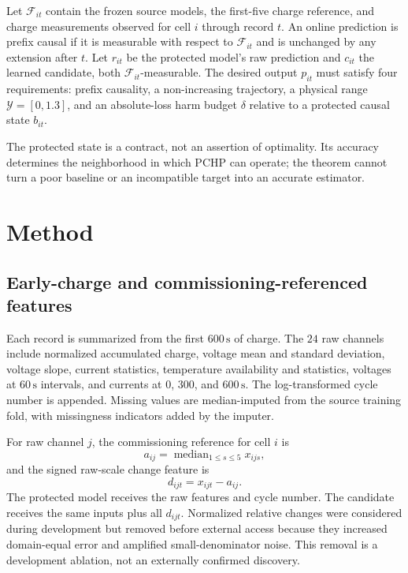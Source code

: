 \documentclass[11pt]{article}
\begin{document}
Let $\mathcal F_{it}$ contain the frozen source models, the first-five charge reference, and charge measurements observed for cell $i$ through record $t$. An online prediction is prefix causal if it is measurable with respect to $\mathcal F_{it}$ and is unchanged by any extension after $t$. Let $r_{it}$ be the protected model's raw prediction and $c_{it}$ the learned candidate, both $\mathcal F_{it}$-measurable. The desired output $p_{it}$ must satisfy four requirements: prefix causality, a non-increasing trajectory, a physical range $\mathcal Y=[0,1.3]$, and an absolute-loss harm budget $\delta$ relative to a protected causal state $b_{it}$.

The protected state is a contract, not an assertion of optimality. Its accuracy determines the neighborhood in which PCHP can operate; the theorem cannot turn a poor baseline or an incompatible target into an accurate estimator.

\section{Method}

\subsection{Early-charge and commissioning-referenced features}

Each record is summarized from the first $600\,\mathrm{s}$ of charge. The $24$ raw channels include normalized accumulated charge, voltage mean and standard deviation, voltage slope, current statistics, temperature availability and statistics, voltages at $60\,\mathrm{s}$ intervals, and currents at $0$, $300$, and $600\,\mathrm{s}$. The log-transformed cycle number is appended. Missing values are median-imputed from the source training fold, with missingness indicators added by the imputer.

For raw channel $j$, the commissioning reference for cell $i$ is
\begin{equation}
  a_{ij}=\operatorname{median}_{1\leq s\leq5}x_{ijs},
\end{equation}
and the signed raw-scale change feature is
\begin{equation}
  d_{ijt}=x_{ijt}-a_{ij}.
  \label{eq:change}
\end{equation}
The protected model receives the raw features and cycle number. The candidate receives the same inputs plus all $d_{ijt}$. Normalized relative changes were considered during development but removed before external access because they increased domain-equal error and amplified small-denominator noise. This removal is a development ablation, not an externally confirmed discovery.
\end{document}
